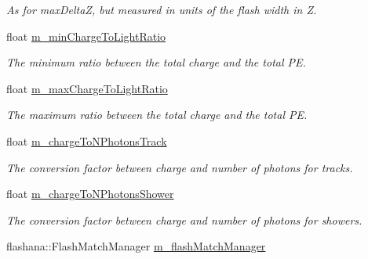 \begin{DoxyCompactItemize}
\begin{DoxyCompactList}\small\item\em As for max\-Delta\-Z, but measured in units of the flash width in Z. \end{DoxyCompactList}\item 
\hypertarget{classflashmatch_1_1FlashMatchingTool_ab4b223f8fca98bb3e6372762228b3065}{float \hyperlink{classflashmatch_1_1FlashMatchingTool_ab4b223f8fca98bb3e6372762228b3065}{m\-\_\-min\-Charge\-To\-Light\-Ratio}}\label{classflashmatch_1_1FlashMatchingTool_ab4b223f8fca98bb3e6372762228b3065}

\begin{DoxyCompactList}\small\item\em The minimum ratio between the total charge and the total P\-E. \end{DoxyCompactList}\item 
\hypertarget{classflashmatch_1_1FlashMatchingTool_a2f5ba137ceabb7e78a992db8f66ff0ad}{float \hyperlink{classflashmatch_1_1FlashMatchingTool_a2f5ba137ceabb7e78a992db8f66ff0ad}{m\-\_\-max\-Charge\-To\-Light\-Ratio}}\label{classflashmatch_1_1FlashMatchingTool_a2f5ba137ceabb7e78a992db8f66ff0ad}

\begin{DoxyCompactList}\small\item\em The maximum ratio between the total charge and the total P\-E. \end{DoxyCompactList}\item 
\hypertarget{classflashmatch_1_1FlashMatchingTool_a89d4a6c3dae8a3a8aa0db8c0c9a0cb21}{float \hyperlink{classflashmatch_1_1FlashMatchingTool_a89d4a6c3dae8a3a8aa0db8c0c9a0cb21}{m\-\_\-charge\-To\-N\-Photons\-Track}}\label{classflashmatch_1_1FlashMatchingTool_a89d4a6c3dae8a3a8aa0db8c0c9a0cb21}

\begin{DoxyCompactList}\small\item\em The conversion factor between charge and number of photons for tracks. \end{DoxyCompactList}\item 
\hypertarget{classflashmatch_1_1FlashMatchingTool_ab914c01e557cee0b0dd0c461759e7135}{float \hyperlink{classflashmatch_1_1FlashMatchingTool_ab914c01e557cee0b0dd0c461759e7135}{m\-\_\-charge\-To\-N\-Photons\-Shower}}\label{classflashmatch_1_1FlashMatchingTool_ab914c01e557cee0b0dd0c461759e7135}

\begin{DoxyCompactList}\small\item\em The conversion factor between charge and number of photons for showers. \end{DoxyCompactList}\item 
\hypertarget{classflashmatch_1_1FlashMatchingTool_a11b980eee1a9ecbe15663af51885846d}{flashana\-::\-Flash\-Match\-Manager \hyperlink{classflashmatch_1_1FlashMatchingTool_a11b980eee1a9ecbe15663af51885846d}{m\-\_\-flash\-Match\-Manager}}\label{classflashmatch_1_1FlashMatchingTool_a11b980eee1a9ecbe15663af51885846d}


\end{DoxyCompactItemize}
